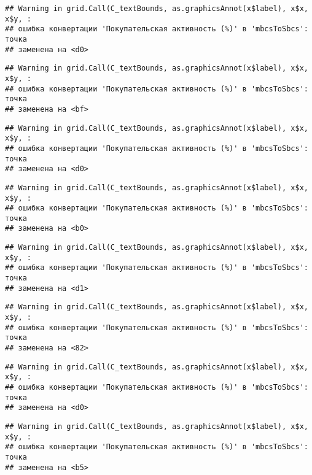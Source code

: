 \documentclass[
]{article}
\begin{document}
\begin{verbatim}
## Warning in grid.Call(C_textBounds, as.graphicsAnnot(x$label), x$x, x$y, :
## ошибка конвертации 'Покупательская активность (%)' в 'mbcsToSbcs': точка
## заменена на <d0>
\end{verbatim}

\begin{verbatim}
## Warning in grid.Call(C_textBounds, as.graphicsAnnot(x$label), x$x, x$y, :
## ошибка конвертации 'Покупательская активность (%)' в 'mbcsToSbcs': точка
## заменена на <bf>
\end{verbatim}

\begin{verbatim}
## Warning in grid.Call(C_textBounds, as.graphicsAnnot(x$label), x$x, x$y, :
## ошибка конвертации 'Покупательская активность (%)' в 'mbcsToSbcs': точка
## заменена на <d0>
\end{verbatim}

\begin{verbatim}
## Warning in grid.Call(C_textBounds, as.graphicsAnnot(x$label), x$x, x$y, :
## ошибка конвертации 'Покупательская активность (%)' в 'mbcsToSbcs': точка
## заменена на <b0>
\end{verbatim}

\begin{verbatim}
## Warning in grid.Call(C_textBounds, as.graphicsAnnot(x$label), x$x, x$y, :
## ошибка конвертации 'Покупательская активность (%)' в 'mbcsToSbcs': точка
## заменена на <d1>
\end{verbatim}

\begin{verbatim}
## Warning in grid.Call(C_textBounds, as.graphicsAnnot(x$label), x$x, x$y, :
## ошибка конвертации 'Покупательская активность (%)' в 'mbcsToSbcs': точка
## заменена на <82>
\end{verbatim}

\begin{verbatim}
## Warning in grid.Call(C_textBounds, as.graphicsAnnot(x$label), x$x, x$y, :
## ошибка конвертации 'Покупательская активность (%)' в 'mbcsToSbcs': точка
## заменена на <d0>
\end{verbatim}

\begin{verbatim}
## Warning in grid.Call(C_textBounds, as.graphicsAnnot(x$label), x$x, x$y, :
## ошибка конвертации 'Покупательская активность (%)' в 'mbcsToSbcs': точка
## заменена на <b5>
\end{verbatim}
\end{document}
